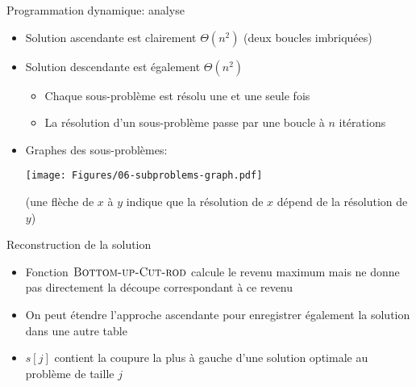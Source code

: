 \begin{frame}{Programmation dynamique: analyse}

\begin{itemize}
\item Solution ascendante est clairement $\Theta(n^2)$ (deux boucles imbriquées)
\item Solution descendante est également $\Theta(n^2)$
\begin{itemize}
\item Chaque sous-problème est résolu une et une seule fois
\item La résolution d'un sous-problème passe par une boucle à $n$ itérations
\end{itemize}
\item Graphes des sous-problèmes:

\centerline{\texttt{[image: Figures/06-subproblems-graph.pdf]}}

(une flèche de $x$ à $y$ indique que la résolution de $x$ dépend de la résolution de $y$)
\end{itemize}


\end{frame}

\begin{frame}{Reconstruction de la solution}
\begin{itemize}
\item Fonction $\textnormal{\scshape Bottom-up-Cut-rod}$ calcule le revenu maximum mais ne donne pas directement la découpe correspondant à ce revenu
\item On peut étendre l'approche ascendante pour enregistrer également la solution dans une autre table
\end{itemize}

\begin{center}
{\footnotesize
{}
}
\end{center}

\begin{itemize}
\item $s[j]$ contient la coupure la plus à gauche d'une solution
  optimale au problème de taille $j$
\end{itemize}

\end{frame}


